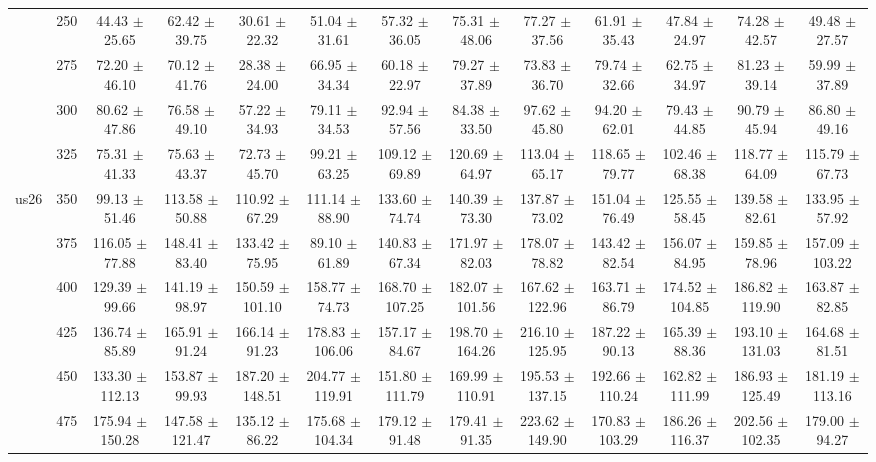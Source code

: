 \begin{table}[h]
{\begin{tabular}{
        ccccccccccccc}
 & 250& 44.43 $\pm$ 25.65& 62.42 $\pm$ 39.75& 30.61 $\pm$ 22.32& 51.04 $\pm$ 31.61& 57.32 $\pm$ 36.05& 75.31 $\pm$ 48.06& 77.27 $\pm$ 37.56& 61.91 $\pm$ 35.43& 47.84 $\pm$ 24.97& 74.28 $\pm$ 42.57& 49.48 $\pm$ 27.57 \\ 
 & 275& 72.20 $\pm$ 46.10& 70.12 $\pm$ 41.76& 28.38 $\pm$ 24.00& 66.95 $\pm$ 34.34& 60.18 $\pm$ 22.97& 79.27 $\pm$ 37.89& 73.83 $\pm$ 36.70& 79.74 $\pm$ 32.66& 62.75 $\pm$ 34.97& 81.23 $\pm$ 39.14& 59.99 $\pm$ 37.89 \\ 
 & 300& 80.62 $\pm$ 47.86& 76.58 $\pm$ 49.10& 57.22 $\pm$ 34.93& 79.11 $\pm$ 34.53& 92.94 $\pm$ 57.56& 84.38 $\pm$ 33.50& 97.62 $\pm$ 45.80& 94.20 $\pm$ 62.01& 79.43 $\pm$ 44.85& 90.79 $\pm$ 45.94& 86.80 $\pm$ 49.16 \\ 
 & 325& 75.31 $\pm$ 41.33& 75.63 $\pm$ 43.37& 72.73 $\pm$ 45.70& 99.21 $\pm$ 63.25& 109.12 $\pm$ 69.89& 120.69 $\pm$ 64.97& 113.04 $\pm$ 65.17& 118.65 $\pm$ 79.77& 102.46 $\pm$ 68.38& 118.77 $\pm$ 64.09& 115.79 $\pm$ 67.73 \\ 
\multirow{4}{*}{us26}& 350& 99.13 $\pm$ 51.46& 113.58 $\pm$ 50.88& 110.92 $\pm$ 67.29& 111.14 $\pm$ 88.90& 133.60 $\pm$ 74.74& 140.39 $\pm$ 73.30& 137.87 $\pm$ 73.02& 151.04 $\pm$ 76.49& 125.55 $\pm$ 58.45& 139.58 $\pm$ 82.61& 133.95 $\pm$ 57.92 \\ 
 & 375& 116.05 $\pm$ 77.88& 148.41 $\pm$ 83.40& 133.42 $\pm$ 75.95& 89.10 $\pm$ 61.89& 140.83 $\pm$ 67.34& 171.97 $\pm$ 82.03& 178.07 $\pm$ 78.82& 143.42 $\pm$ 82.54& 156.07 $\pm$ 84.95& 159.85 $\pm$ 78.96& 157.09 $\pm$ 103.22 \\ 
 & 400& 129.39 $\pm$ 99.66& 141.19 $\pm$ 98.97& 150.59 $\pm$ 101.10& 158.77 $\pm$ 74.73& 168.70 $\pm$ 107.25& 182.07 $\pm$ 101.56& 167.62 $\pm$ 122.96& 163.71 $\pm$ 86.79& 174.52 $\pm$ 104.85& 186.82 $\pm$ 119.90& 163.87 $\pm$ 82.85 \\ 
 & 425& 136.74 $\pm$ 85.89& 165.91 $\pm$ 91.24& 166.14 $\pm$ 91.23& 178.83 $\pm$ 106.06& 157.17 $\pm$ 84.67& 198.70 $\pm$ 164.26& 216.10 $\pm$ 125.95& 187.22 $\pm$ 90.13& 165.39 $\pm$ 88.36& 193.10 $\pm$ 131.03& 164.68 $\pm$ 81.51 \\ 
 & 450& 133.30 $\pm$ 112.13& 153.87 $\pm$ 99.93& 187.20 $\pm$ 148.51& 204.77 $\pm$ 119.91& 151.80 $\pm$ 111.79& 169.99 $\pm$ 110.91& 195.53 $\pm$ 137.15& 192.66 $\pm$ 110.24& 162.82 $\pm$ 111.99& 186.93 $\pm$ 125.49& 181.19 $\pm$ 113.16 \\ 
 & 475& 175.94 $\pm$ 150.28& 147.58 $\pm$ 121.47& 135.12 $\pm$ 86.22& 175.68 $\pm$ 104.34& 179.12 $\pm$ 91.48& 179.41 $\pm$ 91.35& 223.62 $\pm$ 149.90& 170.83 $\pm$ 103.29& 186.26 $\pm$ 116.37& 202.56 $\pm$ 102.35& 179.00 $\pm$ 94.27 \\ 

\end{tabular}}
\end{table}
